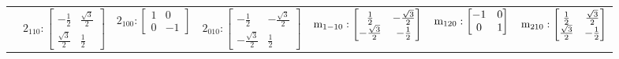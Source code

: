 \documentclass[fleqn,8pt,landscape]{jsarticle}
\begin{document}
\begin{longtable}{ccccccc}
& $ 2{}_{110}:\begin{bmatrix} - \frac{1}{2} & \frac{\sqrt{3}}{2} \\ \frac{\sqrt{3}}{2} & \frac{1}{2} \end{bmatrix} $ & $ 2{}_{100}:\begin{bmatrix} 1 & 0 \\ 0 & -1 \end{bmatrix} $ & $ 2{}_{010}:\begin{bmatrix} - \frac{1}{2} & - \frac{\sqrt{3}}{2} \\ - \frac{\sqrt{3}}{2} & \frac{1}{2} \end{bmatrix} $ & $ {\rm m}_{1-10}:\begin{bmatrix} \frac{1}{2} & - \frac{\sqrt{3}}{2} \\ - \frac{\sqrt{3}}{2} & - \frac{1}{2} \end{bmatrix} $ & $ {\rm m}_{120}:\begin{bmatrix} -1 & 0 \\ 0 & 1 \end{bmatrix} $ & $ {\rm m}_{210}:\begin{bmatrix} \frac{1}{2} & \frac{\sqrt{3}}{2} \\ \frac{\sqrt{3}}{2} & - \frac{1}{2} \end{bmatrix} $ \\
\end{longtable}
\end{document}
